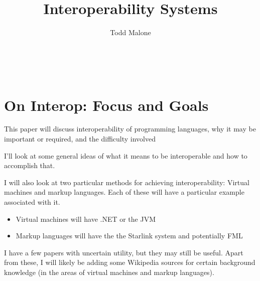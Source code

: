 \documentclass{sig-alternate}
\begin{document}

\title{Interoperability Systems}


\author{
\alignauthor
Todd Malone\\
	\\
	\\
	\\
}

\maketitle


\section{On Interop: Focus and Goals}
This paper will discuss interoperability of programming languages, why it may be important or required, and the difficulty involved\cite{Shetty:2009,Chisnall:2013}

I'll look at some general ideas of what it means to be interoperable and how to accomplish that.\cite{ide:2010, Osera:2012}

I will also look at two particular methods for achieving interoperability: Virtual machines and markup languages. Each of these will have a particular example associated with it.
\begin{itemize}
\item Virtual machines will have .NET or the JVM \cite{Li:2013,Hamilton:2003}
\item Markup languages will have the the Starlink system \cite{Bromberk:2011} and potentially FML \cite{Acampora:2013}
\end{itemize}

I have a few papers with uncertain utility\cite{Kats:2010,Matthews:2009, Chen:2010}, but they may still be useful.
Apart from these, I will likely be adding some Wikipedia sources for certain background knowledge (in the areas of virtual machines and markup languages).


  

\end{document}
